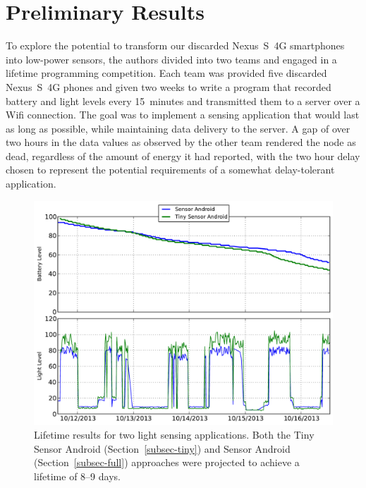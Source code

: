 \section{Preliminary Results}
\label{sec-results}

To explore the potential to transform our discarded Nexus~S~4G smartphones
into low-power sensors, the authors divided into two teams and engaged in a
lifetime programming competition. Each team was provided five discarded
Nexus~S~4G phones and given two weeks to write a program that recorded
battery and light levels every 15~minutes and transmitted them to a server
over a Wifi connection. The goal was to implement a sensing application that
would last as long as possible, while maintaining data delivery to the
server. A gap of over two hours in the data values as observed by the other
team rendered the node as dead, regardless of the amount of energy it had
reported, with the two hour delay chosen to represent the potential
requirements of a somewhat delay-tolerant application.

\begin{figure}[t]
\includegraphics[width=\columnwidth]{./figures/comparison.pdf}

\caption{\small Lifetime results for two light sensing applications.
\textnormal{Both the Tiny Sensor Android (Section~\ref{subsec-tiny}) and
Sensor Android (Section~\ref{subsec-full}) approaches were projected to
achieve a lifetime of 8--9 days.}}

\label{fig-comparison}
\end{figure}



